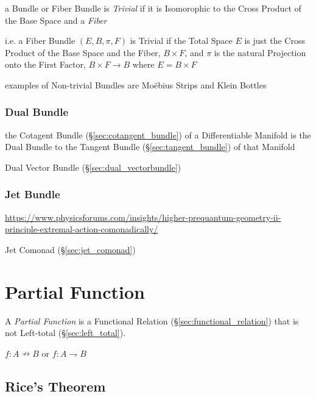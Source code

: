 a Bundle or Fiber Bundle is \emph{Trivial} if it is Isomorophic to the Cross
Product of the Base Space and a \emph{Fiber}

i.e. a Fiber Bundle $(E, B, \pi, F)$ is Trivial if the Total Space $E$ is just
the Cross Product of the Base Space and the Fiber, $B \times F$, and $\pi$ is
the natural Projection onto the First Factor, $B \times F \to B$ where
$E = B \times F$

examples of Non-trivial Bundles are Mo\"ebius Strips and Klein Bottles



\subsubsection{Dual Bundle}\label{sec:dual_bundle}

the Cotagent Bundle (\S\ref{sec:cotangent_bundle}) of a Differentiable Manifold
is the Dual Bundle to the Tangent Bundle (\S\ref{sec:tangent_bundle}) of that
Manifold

\fist Dual Vector Bundle (\S\ref{sec:dual_vectorbundle})



\subsubsection{Jet Bundle}\label{sec:jet_bundle}

\url{https://www.physicsforums.com/insights/higher-prequantum-geometry-ii-principle-extremal-action-comonadically/}

\fist Jet Comonad (\S\ref{sec:jet_comonad})





\section{Partial Function}\label{sec:partial_function}

A \emph{Partial Function} is a Functional Relation
(\S\ref{sec:functional_relation}) that is not Left-total
(\S\ref{sec:left_total}).

$f : A \nrightarrow B$ or $f : A \rightharpoondown B$




\subsection{Rice's Theorem}\label{sec:rices_theorem}

